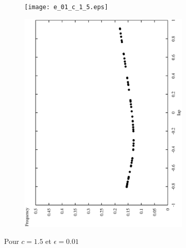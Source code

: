 \documentclass[12pt,a4paper,onecolumn]{article}
\begin{document}
\begin{figure}[htb]\ContinuedFloat
	\centering
	\begin{subfigure}[b]{\textwidth}
		\texttt{[image: e\_01\_c\_1\_5.eps]}
	\end{subfigure}

	\begin{subfigure}[b]{\textwidth}
		\includegraphics[angle = 270, width = 0.9\textwidth]{freq_c_1_5.eps}
	\end{subfigure}
	\caption{Pour $c = 1.5$ et $\epsilon = 0.01$}
\end{figure}
\end{document}
